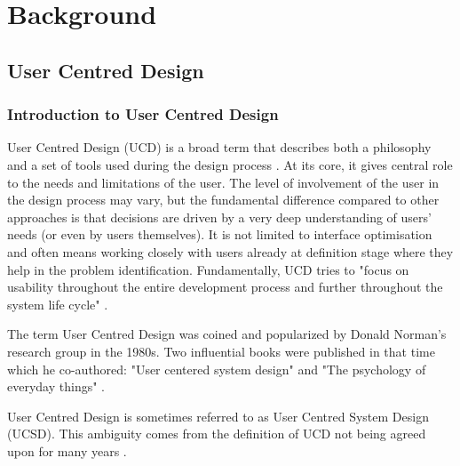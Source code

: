 
\chapter{Background}

	\section{User Centred Design}

		\subsection{Introduction to User Centred Design}

User Centred Design (UCD) is a broad term that describes both a philosophy and a set of tools used during the design process \citep{norman1986user, norman2013design}. At its core, it gives central role to the needs and limitations of the user. The level of involvement of the user in the design process may vary, but the fundamental difference compared to other approaches is that decisions are driven by a very deep understanding of users' needs (or even by users themselves). It is not limited to interface optimisation and often means working closely with users already at definition stage where they help in the problem identification. Fundamentally, UCD tries to "focus on usability throughout the entire development process and further throughout the system life cycle" \citep{Gulliksen2003}.

The term User Centred Design was coined and popularized by Donald Norman's research group in the 1980s. Two influential books were published in that time which he co-authored: "User centered system design" \citep{norman1986user} and "The psychology of everyday things" \citep{norman1988design}.

User Centred Design is sometimes referred to as User Centred System Design (UCSD). This ambiguity comes from the definition of UCD not being agreed upon for many years \citep{Gulliksen2003}.

